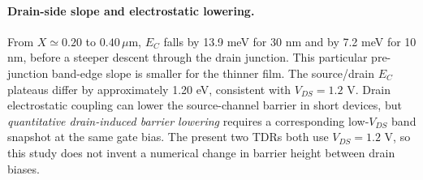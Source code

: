 \paragraph{Drain-side slope and electrostatic lowering.}
From $X\simeq0.20$ to $0.40\,\mu$m,
$E_C$ falls by 13.9 meV for 30 nm
and by 7.2 meV for 10 nm, before
a steeper descent through the drain junction.
This particular pre-junction band-edge slope
is smaller for the thinner film.
The source/drain $E_C$ plateaus differ by
approximately 1.20 eV, consistent with
$V_{DS}=1.2$ V. Drain electrostatic coupling
can lower the source-channel barrier in short
devices, but \emph{quantitative drain-induced
barrier lowering} requires a corresponding
low-$V_{DS}$ band snapshot at the same gate
bias. The present two TDRs both use
$V_{DS}=1.2$ V, so this study does not
invent a numerical change in barrier height
between drain biases.
